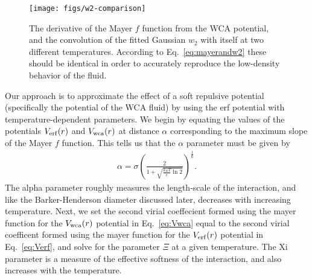 \documentclass[letterpaper,twocolumn,amsmath,amssymb,prb]{revtex4-1}
\begin{document}

\begin{figure}
\begin{center}
\texttt{[image: figs/w2-comparison]}
\end{center}
\caption{The derivative of the Mayer $f$ function from the WCA
  potential, and the convolution of the fitted Gaussian $w_2$ with
  itself at two different temperatures.  According to
  Eq.~\ref{eq:mayerandw2} these should be identical in order to
  accurately reproduce the low-density behavior of the fluid.}
\label{fig:w2-comparison}
\end{figure}

Our approach is to approximate the effect of a soft repulsive potential
(specifically the potential of the WCA fluid) by using the erf
potential with temperature-dependent parameters. 
We begin by equating the values of the potentials $V_{\mathrm{erf}}(r)$ and $V_{\mathrm{wca}}(r)$ at distance
$\alpha$ corresponding to
the maximum slope of the Mayer $f$ function. This tells us that the $\alpha$ parameter must be given by
\begin{align}
  \alpha = \sigma \left( \frac{2}{1 + \sqrt{\frac{k_BT}{\epsilon}
        \ln 2}} \right)^{\frac{1}{6}}.
\end{align}
The alpha parameter roughly measures the length-scale of the
interaction, and like the Barker-Henderson diameter discussed later, decreases with
increasing temperature.  Next, we set the second virial coeffecient formed using 
the mayer function for the $V_{\mathrm{wca}}(r)$ potential in Eq.~\ref{eq:Vwca} equal to the second virial coefficent formed using the mayer function for the $V_{\mathrm{erf}}(r)$ potential in Eq.~\ref{eq:Verf}, and solve for the parameter $\Xi$ at a given temperature.
The Xi parameter is a measure of the effective softness of the interaction, and
also increases with the temperature.  
\end{document}
